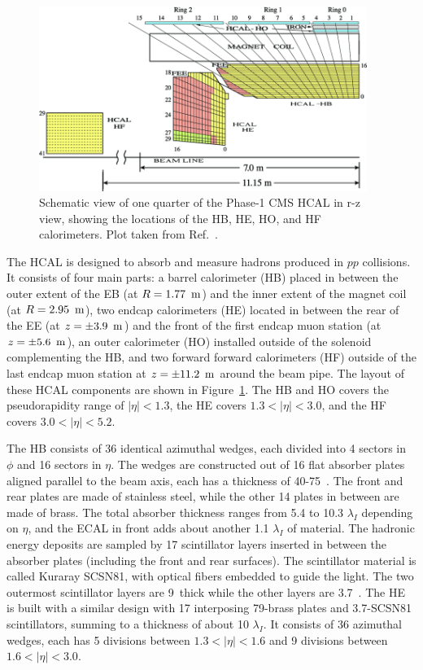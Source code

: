 \begin{figure}[!htb]
    \centering
    \includegraphics[width=0.95\textwidth]{pics/LHC_CMS/HCAL.png}
    \caption{Schematic view of one quarter of the Phase-1 CMS HCAL in r-z view,
             showing the locations of the HB, HE, HO, and HF calorimeters.
             Plot taken from Ref.~\cite{Mans:1481837}.}
    \label{fig:cms_hcal}
\end{figure}

The HCAL is designed to absorb and measure hadrons produced in $pp$ collisions.
It consists of four main parts: a barrel calorimeter (HB) placed in between the outer extent of the EB (at $R = 1.77~\meter$) and the inner extent of the magnet coil (at $R = 2.95~\meter$),
two endcap calorimeters (HE) located in between the rear of the EE (at $z = \pm 3.9~\meter$) and the front of the first endcap muon station (at $z = \pm 5.6~\meter$),
an outer calorimeter (HO) installed outside of the solenoid complementing the HB,
and two forward forward calorimeters (HF) outside of the last endcap muon station at $z = \pm 11.2~\meter$ around the beam pipe.
The layout of these HCAL components are shown in Figure~\ref{fig:cms_hcal}.
The HB and HO covers the pseudorapidity range of $|\eta| < 1.3$, the HE covers $1.3 < |\eta| < 3.0$,
and the HF covers $3.0 < |\eta| < 5.2$.

The HB consists of 36 identical azimuthal wedges, each divided into 4 sectors in $\phi$ and 16 sectors in $\eta$.
The wedges are constructed out of 16 flat absorber plates aligned parallel to the beam axis, each has a thickness of 40-75~\mm.
The front and rear plates are made of stainless steel, while the other 14 plates in between are made of brass.
The total absorber thickness ranges from 5.4 to 10.3 $\lambda_{I}$ depending on $\eta$, and the ECAL in front adds about another 1.1 $\lambda_{I}$ of material.
The hadronic energy deposits are sampled by 17 scintillator layers inserted in between the absorber plates (including the front and rear surfaces).
The scintillator material is called Kuraray SCSN81, with optical fibers embedded to guide the light.
The two outermost scintillator layers are 9~\mm thick while the other layers are 3.7~\mm.
The HE is built with a similar design with 17 interposing 79-\mm brass plates and 3.7-\mm SCSN81 scintillators, summing to a thickness of about 10 $\lambda_{I}$.
It consists of 36 azimuthal wedges, each has 5 divisions between $1.3 < |\eta| < 1.6$ and 9 divisions between $1.6 < |\eta| < 3.0$.

